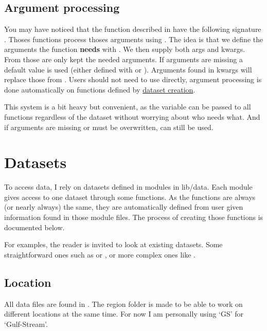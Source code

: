 \subsection{Argument processing}
\label{sec:org-arg-processing}

You may have noticed that the function described in  have the following signature .
Thoses functions process thoses arguments using .
The idea is that we define the arguments the function \textbf{needs} with .
We then supply both args and kwargs. From those are only kept the needed arguments.
If arguments are missing a default value is used (either defined with  or ).
Arguments found in kwargs will replace those from .
Users should not need to use  directly, argument processing is done automatically on functions defined by \hyperref[sec:org-datasets]{dataset creation}.

This system is a bit heavy but convenient, as the variable  can be passed to all functions regardless of the dataset without worrying about who needs what. And if arguments are missing or must be overwritten,  can still be used.

\section{Datasets}
\label{sec:org-datasets}

To access data, I rely on datasets defined in modules in lib/data.
Each module gives access to one dataset through some functions.
As the functions are always (or nearly always) the same, they are automatically defined from user given information found in those module files. The process of creating those functions is documented below.

For examples, the reader is invited to look at existing datasets.
Some straightforward ones such as  or , or more complex ones like .

\subsection{Location}
All data files are found in .
The region folder is made to be able to work on different locations at the same time.
For now I am personally using `GS' for `Gulf-Stream'.

